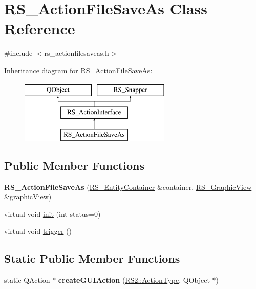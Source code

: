 \hypertarget{classRS__ActionFileSaveAs}{\section{R\-S\-\_\-\-Action\-File\-Save\-As Class Reference}
\label{classRS__ActionFileSaveAs}
}


{\ttfamily \#include $<$rs\-\_\-actionfilesaveas.\-h$>$}

Inheritance diagram for R\-S\-\_\-\-Action\-File\-Save\-As\-:\begin{figure}[H]
\begin{center}
\leavevmode
\includegraphics[height=3.000000cm]{classRS__ActionFileSaveAs}
\end{center}
\end{figure}
\subsection*{Public Member Functions}
\begin{DoxyCompactItemize}
\item 
\hypertarget{classRS__ActionFileSaveAs_a4b60761287aa562a8ce78dee40829fe4}{{\bfseries R\-S\-\_\-\-Action\-File\-Save\-As} (\hyperlink{classRS__EntityContainer}{R\-S\-\_\-\-Entity\-Container} \&container, \hyperlink{classRS__GraphicView}{R\-S\-\_\-\-Graphic\-View} \&graphic\-View)}\label{classRS__ActionFileSaveAs_a4b60761287aa562a8ce78dee40829fe4}

\item 
virtual void \hyperlink{classRS__ActionFileSaveAs_a5a4e874d362e87ebc1612bdc3af99f67}{init} (int status=0)
\item 
virtual void \hyperlink{classRS__ActionFileSaveAs_ac68fb93ea55c8763dc4fe8e491d48224}{trigger} ()
\end{DoxyCompactItemize}
\subsection*{Static Public Member Functions}
\begin{DoxyCompactItemize}
\item 
\hypertarget{classRS__ActionFileSaveAs_abcdbd81dd08f871b1a999e707e7a5a5b}{static Q\-Action $\ast$ {\bfseries create\-G\-U\-I\-Action} (\hyperlink{classRS2_afe3523e0bc41fd637b892321cfc4b9d7}{R\-S2\-::\-Action\-Type}, Q\-Object $\ast$)}\label{classRS__ActionFileSaveAs_abcdbd81dd08f871b1a999e707e7a5a5b}

\end{DoxyCompactItemize}
